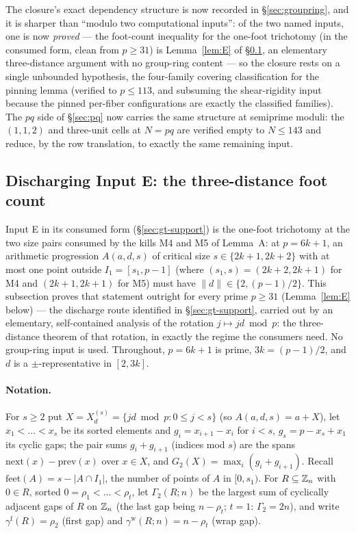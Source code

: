 \begin{remark}
The closure's exact dependency structure is now recorded in
\S\ref{sec:groupring}, and it is sharper than ``modulo two computational
inputs'': of the two named inputs, one is now \emph{proved} --- the
foot-count inequality for the one-foot trichotomy (in the consumed form,
clean from $p\ge31$) is Lemma~\ref{lem:E} of \S\ref{sec:lemmaE}, an
elementary three-distance argument with no group-ring content --- so the
closure rests on a single unbounded hypothesis, the four-family covering
classification for the pinning lemma (verified to $p\le113$, and
subsuming the shear-rigidity input because the pinned per-fiber
configurations are exactly the classified families). The $pq$
side of \S\ref{sec:pq} now carries the same structure at semiprime moduli:
the $(1,1,2)$ and three-unit cells at $N=pq$ are verified empty to
$N\le143$ and reduce, by the row translation, to exactly the same
remaining input.
\end{remark}

\subsection{Discharging Input E: the three-distance foot count}\label{sec:lemmaE}

Input E in its consumed form (\S\ref{sec:gt-support}) is the one-foot
trichotomy at the two size pairs consumed by the kills M4 and M5 of
Lemma~A: at $p=6k+1$, an arithmetic progression $A(a,d,s)$ of critical
size $s\in\{2k{+}1,2k{+}2\}$ with at most one point outside
$I_1=[s_1,p-1]$ (where $(s_1,s)=(2k{+}2,2k{+}1)$ for M4 and
$(2k{+}1,2k{+}1)$ for M5) must have $\|d\|\in\{2,(p-1)/2\}$. This
subsection proves that statement outright for every prime $p\ge31$
(Lemma~\ref{lem:E} below) --- the discharge route identified in
\S\ref{sec:gt-support}, carried out by an elementary, self-contained
analysis of the rotation $j\mapsto jd\bmod p$: the three-distance
theorem of that rotation, in exactly the regime the consumers need. No
group-ring input is used. Throughout, $p=6k+1$ is prime, $3k=(p-1)/2$,
and $d$ is a $\pm$-representative in $[2,3k]$.

\paragraph{Notation.} For $s\ge2$ put
$X=X^{(s)}_d=\{jd\bmod p:0\le j<s\}$ (so $A(a,d,s)=a+X$), let
$x_1<\dots<x_s$ be its sorted elements and $g_i=x_{i+1}-x_i$ for $i<s$,
$g_s=p-x_s+x_1$ its cyclic gaps; the pair sums $g_i+g_{i+1}$ (indices
mod $s$) are the spans $\mathrm{next}(x)-\mathrm{prev}(x)$ over $x\in
X$, and $G_2(X)=\max_i(g_i+g_{i+1})$. Recall
$\mathrm{feet}(A)=s-|A\cap I_1|$, the number of points of $A$ in
$[0,s_1)$. For $R\subseteq\mathbb{Z}_n$ with $0\in R$, sorted
$0=\rho_1<\dots<\rho_t$, let $\Gamma_2(R;n)$ be the largest sum of
cyclically adjacent gaps of $R$ on $\mathbb{Z}_n$ (the last gap being
$n-\rho_t$; $t=1$: $\Gamma_2=2n$), and write
$\gamma^{\mathrm f}(R)=\rho_2$ (first gap) and
$\gamma^{\mathrm w}(R;n)=n-\rho_t$ (wrap gap).

